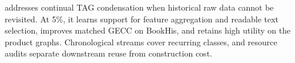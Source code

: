\method{} addresses continual TAG condensation when historical raw data cannot
be revisited. At 5\%, it learns support for feature aggregation and readable
text selection, improves matched GECC on BookHis, and retains high utility on
the product graphs. Chronological streams cover recurring classes, and resource
audits separate downstream reuse from construction cost.
